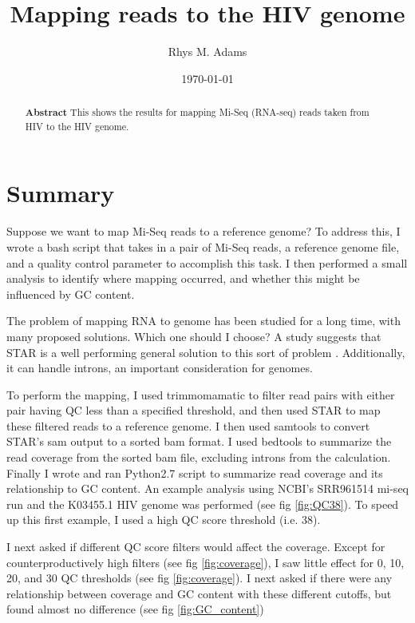 \documentclass[article]{revtex4}
\begin{document}
\title{Mapping reads to the HIV genome}
\author{Rhys M. Adams}
\date{\today}

\begin{abstract}
\textbf{Abstract}
This shows the results for mapping Mi-Seq (RNA-seq) reads taken from HIV to the HIV genome. 
\end{abstract}

\maketitle

\section{Summary}
Suppose we want to map Mi-Seq reads to a reference genome? To address this, I wrote a bash script that takes in a pair of Mi-Seq reads, a reference genome file, and a quality control parameter to accomplish this task. I then performed a small analysis to identify where mapping occurred, and whether this might be influenced by GC content.

The problem of mapping RNA to genome has been studied for a long time, with many proposed solutions. Which one should I choose? A study suggests that STAR is a well performing general solution to this sort of problem \cite{engstrom_systematic_2013}. Additionally, it can handle introns, an important consideration for genomes.

To perform the mapping, I used trimmomamatic to filter read pairs with either pair having QC less than a specified threshold, and then used STAR to map these filtered reads to a reference genome. I then used samtools to convert STAR's sam output to a sorted bam format. I used bedtools to summarize the read coverage from the sorted bam file, excluding introns from the calculation. Finally I wrote and ran Python2.7 script to summarize read coverage and its relationship to GC content. An example analysis using NCBI's SRR961514 mi-seq run and the K03455.1 HIV genome was performed (see fig \ref{fig:QC38}). To speed up this first example, I used a high QC score threshold (i.e. 38).

I next asked if different QC score filters would affect the coverage. Except for counterproductively high filters (see fig \ref{fig:coverage}), I saw little effect for 0, 10, 20, and 30 QC thresholds (see fig \ref{fig:coverage}). I next asked if there were any relationship between coverage and GC content with these different cutoffs, but found almost no difference (see fig \ref{fig:GC_content})
\end{document}
